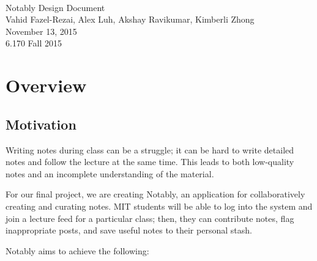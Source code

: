 \documentclass{article}
\begin{document}
\newcommand{\class}{Notably Design Document}
\newcommand{\duedate}{November 13, 2015}
\newcommand{\classsection}{6.170 Fall 2015}
\newcommand{\authors}{Vahid Fazel-Rezai, Alex Luh, Akshay Ravikumar, Kimberli Zhong}


\begin{center}
~\\[1cm]
{\huge \class} \\[0.4cm]
{\large \authors} \\[0.2cm]
{\large \duedate} \\[0.2cm]
{\large \classsection}
\end{center}

\section*{Overview}
\subsection*{Motivation}
Writing notes during class can be a struggle; it can be hard to write detailed notes and follow the lecture at the same time. This leads to both low-quality notes and an incomplete understanding of the material.

For our final project, we are creating Notably, an application for collaboratively creating and curating notes. MIT students will be able to log into the system and join a lecture feed for a particular class; then, they can contribute notes, flag inappropriate posts, and save useful notes to their personal stash.

Notably aims to achieve the following:
\end{document}
